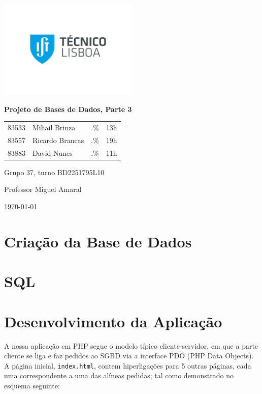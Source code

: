 \documentclass[a4paper]{article}
\begin{document}
    \begin{titlepage}
        \centering
        \includegraphics[width=0.5\textwidth]{IST_A_CMYK_POS.pdf}\par
        {\huge\bfseries Projeto de Bases de Dados, Parte 3\par}
        \vspace{2cm}
        {
        \Large
        \begin{tabular}{llll}
            83533 & Mihail Brinza & .\% & 13h \\
            83557 & Ricardo Brancas & .\% & 19h \\
            83883 & David Nunes & .\% & 11h
        \end{tabular}
        }
        \vfill
        \large
        Grupo 37, turno BD2251795L10 \par
        Professor Miguel Amaral

        \vspace{3cm}

        {\normalsize \today\par}
    \end{titlepage}

    \section{Criação da Base de Dados}
    

    \section{SQL}
    

    \section{Desenvolvimento da Aplicação}
    A nossa aplicação em PHP segue o modelo típico cliente-servidor, em que a parte cliente se liga e faz pedidos ao SGBD
    via a interface PDO (PHP Data Objects).
    A página inicial, \texttt{index.html}, contem hiperligações para 5 outras páginas, cada uma correspondente
    a uma das alíneas pedidas; tal como demonstrado no esquema seguinte:
\end{document}

